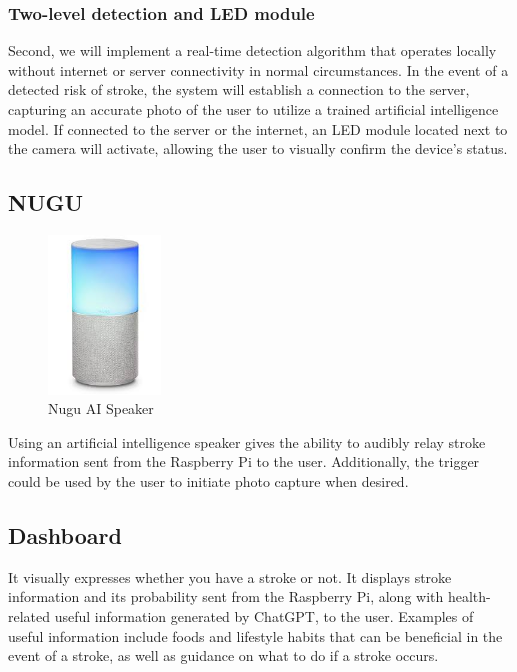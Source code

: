 \subsubsection{\textbf{Two-level detection and LED module}}
Second, we will implement a real-time detection algorithm that operates locally without internet or server connectivity in normal circumstances. In the event of a detected risk of stroke, the system will establish a connection to the server, capturing an accurate photo of the user to utilize a trained artificial intelligence model. If connected to the server or the internet, an LED module located next to the camera will activate, allowing the user to visually confirm the device's status.\\

\subsection{\textbf{NUGU}}

\begin{figure}[htp]
\centering
\includegraphics[width=3cm]{images/nugu.jpeg}
\caption{Nugu AI Speaker}
\label{fig:nugu}
\end{figure}

Using an artificial intelligence speaker gives the ability to audibly relay stroke information sent from the Raspberry Pi to the user. Additionally, the trigger could be used by the user to initiate photo capture when desired.\\

\subsection{\textbf{Dashboard}}
It visually expresses whether you have a stroke or not. It displays stroke information and its probability sent from the Raspberry Pi, along with health-related useful information generated by ChatGPT, to the user. Examples of useful information include foods and lifestyle habits that can be beneficial in the event of a stroke, as well as guidance on what to do if a stroke occurs.\\
